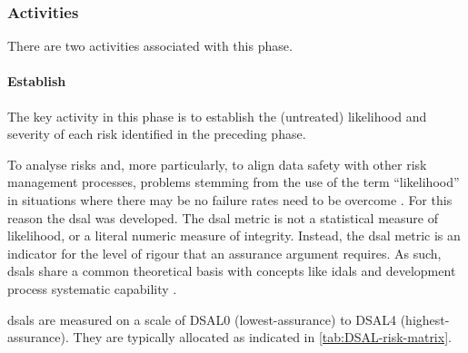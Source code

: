 \subsubsection{Activities}
There are two activities associated with this phase.
%
\paragraph{Establish }
\label{bkm:DSAL-table-section}
The key activity in this phase is to establish the (untreated) likelihood and severity of each risk identified in the preceding phase.

To analyse risks and, more particularly, to align data safety with other risk management processes, \cbstart problems stemming from the use of the term ``likelihood'' in situations where there may be no failure rates need to be overcome \cbend. For this reason the \gls{dsal} was developed. The \gls{dsal} metric is not a statistical measure of likelihood, or a literal numeric measure of \gls{integrity}. Instead, the \gls{dsal} metric is an indicator for the level of rigour that an assurance argument requires. As such, \glspl{dsal} share a common theoretical basis with concepts like \glspl{idal}  \cite{citation:arp4754a2010guidelines} and development process systematic capability \cite{citation:iec615083}.

\glspl{dsal} are measured on a scale of DSAL0 (lowest-assurance) to DSAL4 (highest-assurance). They are typically allocated as indicated in \autoref{tab:DSAL-risk-matrix}.


